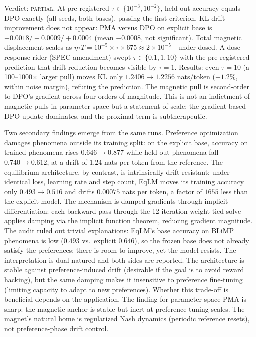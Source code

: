 Verdict: \textsc{partial}. At pre-registered $\tau \in \{10^{-3}, 10^{-2}\}$, held-out accuracy equals DPO exactly (all seeds, both bases), passing the first criterion. KL drift improvement does not appear: PMA versus DPO on explicit base is $-0.0018/-0.0009/+0.0004$ (mean $-0.0008$, not significant). Total magnetic displacement scales as $\eta \tau T = 10^{-5} \times \tau \times 675 \approx 2 \times 10^{-5}$---under-dosed. A dose-response rider (SPEC amendment) swept $\tau \in \{0.1, 1, 10\}$ with the pre-registered prediction that drift reduction becomes visible by $\tau = 1$. Results: even $\tau = 10$ (a 100--1000$\times$ larger pull) moves KL only $1.2406 \to 1.2256$ nats/token ($-1.2\%$, within noise margin), refuting the prediction. The magnetic pull is second-order to DPO's gradient across four orders of magnitude. This is not an indictment of magnetic pulls in parameter space but a statement of scale: the gradient-based DPO update dominates, and the proximal term is subtherapeutic.

Two secondary findings emerge from the same runs. Preference optimization damages phenomena outside its training split: on the explicit base, accuracy on trained phenomena rises $0.646 \to 0.877$ while held-out phenomena fall $0.740 \to 0.612$, at a drift of $1.24$ nats per token from the reference. The equilibrium architecture, by contrast, is intrinsically drift-resistant: under identical loss, learning rate and step count, EqLM moves its training accuracy only $0.493 \to 0.516$ and drifts $0.00075$ nats per token, a factor of $1655$ less than the explicit model. The mechanism is damped gradients through implicit differentiation: each backward pass through the 12-iteration weight-tied solve applies damping via the implicit function theorem, reducing gradient magnitude. The audit ruled out trivial explanations: EqLM's base accuracy on BLiMP phenomena is low ($0.493$ vs.\ explicit $0.646$), so the frozen base does not already satisfy the preferences; there is room to improve, yet the model resists. The interpretation is dual-natured and both sides are reported. The architecture is stable against preference-induced drift (desirable if the goal is to avoid reward hacking), but the same damping makes it insensitive to preference fine-tuning (limiting capacity to adapt to new preferences). Whether this trade-off is beneficial depends on the application. The finding for parameter-space PMA is sharp: the magnetic anchor is stable but inert at preference-tuning scales. The magnet's natural home is regularized Nash dynamics (periodic reference resets), not preference-phase drift control.

